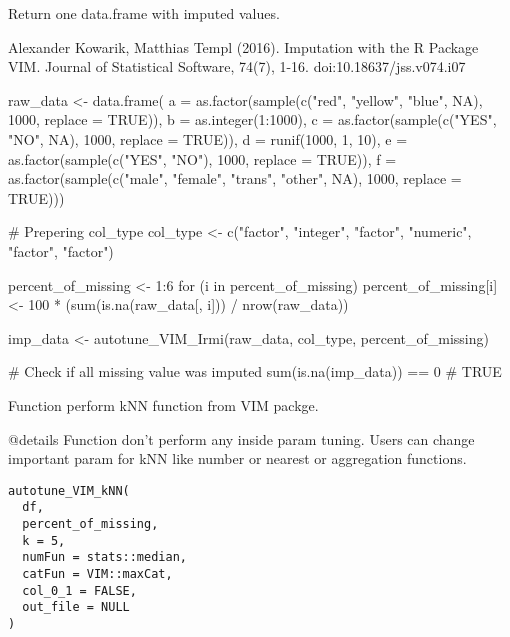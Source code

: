 \documentclass[letterpaper]{book}
\begin{document}
%
\begin{Value}
Return one data.frame with imputed values.
\end{Value}
%
\begin{References}\relax
Alexander Kowarik, Matthias Templ (2016). Imputation with the R Package VIM. Journal of Statistical Software, 74(7), 1-16. doi:10.18637/jss.v074.i07
\end{References}
%
\begin{Examples}
\begin{ExampleCode}
{
  raw_data <- data.frame(
    a = as.factor(sample(c("red", "yellow", "blue", NA), 1000, replace = TRUE)),
    b = as.integer(1:1000),
    c = as.factor(sample(c("YES", "NO", NA), 1000, replace = TRUE)),
    d = runif(1000, 1, 10),
    e = as.factor(sample(c("YES", "NO"), 1000, replace = TRUE)),
    f = as.factor(sample(c("male", "female", "trans", "other", NA), 1000, replace = TRUE)))

  # Prepering col_type
  col_type <- c("factor", "integer", "factor", "numeric", "factor", "factor")

  percent_of_missing <- 1:6
  for (i in percent_of_missing) {
    percent_of_missing[i] <- 100 * (sum(is.na(raw_data[, i])) / nrow(raw_data))
  }


  imp_data <- autotune_VIM_Irmi(raw_data, col_type, percent_of_missing)

  # Check if all missing value was imputed
  sum(is.na(imp_data)) == 0
  # TRUE
}
\end{ExampleCode}
\end{Examples}
%
\begin{Description}\relax
Function perform kNN function from VIM packge.

@details  Function don't perform any inside param tuning. Users can change important param for kNN like number or nearest or aggregation functions.
\end{Description}
%
\begin{Usage}
\begin{verbatim}
autotune_VIM_kNN(
  df,
  percent_of_missing,
  k = 5,
  numFun = stats::median,
  catFun = VIM::maxCat,
  col_0_1 = FALSE,
  out_file = NULL
)
\end{verbatim}
\end{Usage}
%
\end{document}
